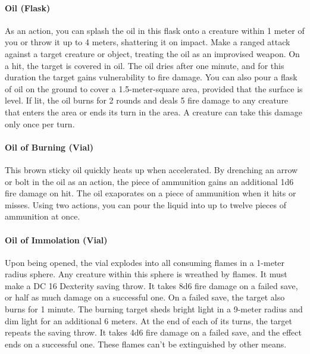     \paragraph{Oil (Flask)}
        As an action, you can splash the oil in this flask onto a creature within 1 meter of you or throw it up to 4 meters, shattering it on impact.
        Make a ranged attack against a target creature or object, treating the oil as an improvised weapon.
        On a hit, the target is covered in oil.
        The oil dries after one minute, and for this duration the target gains vulnerability to fire damage.
        You can also pour a flask of oil on the ground to cover a 1.5-meter-square area, provided that the surface is level.
        If lit, the oil burns for 2 rounds and deals 5 fire damage to any creature that enters the area or ends its turn in the area.
        A creature can take this damage only once per turn.
    \paragraph{Oil of Burning (Vial)} %
        This brown sticky oil quickly heats up when accelerated.
        By drenching an arrow or bolt in the oil as an action, the piece of ammunition gains an additional 1d6 fire damage on hit.
        The oil exaporates on a piece of ammunition when it hits or misses.
        Using two actions, you can pour the liquid into up to twelve pieces of ammunition at once.
    \paragraph{Oil of Immolation (Vial)} %
        Upon being opened, the vial explodes into all consuming flames in a 1-meter radius sphere.
        Any creature within this sphere is wreathed by flames.
        It must make a DC 16 Dexterity saving throw.
        It takes 8d6 fire damage on a failed save, or half as much damage on a successful one.
        On a failed save, the target also burns for 1 minute.
        The burning target sheds bright light in a 9-meter radius and dim light for an additional 6 meters.
        At the end of each of its turns, the target repeats the saving throw.
        It takes 4d6 fire damage on a failed save, and the effect ends on a successful one.
        These flames can't be extinguished by other means.

